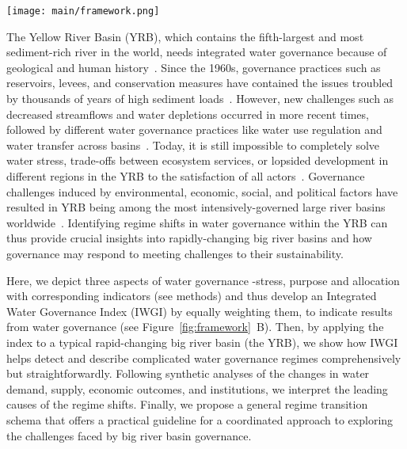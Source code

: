 \begin{figure*}[!ht]
	\centerline{
		\texttt{[image: main/framework.png]}
	}
	\caption{
		\textbf{A.} Identifying the water governance regimes in transitions of a hydrosocial cycle with an integrated water governance index (IWGI). Water stress (S), purposes of water services (P), and water allocation (A) are three aspects to be considered.
		For example, reservoir construction ( and ) can relieve local water stress; The development of intensive irrigated agriculture () and growth of energy industrial demand () will change the purpose of water use; The water delivery system controls water allocation ( and ) within the basin system.
		\textbf{B.} Therefore, the methodology is to combine three aspects' corresponding indicators, and then an abrupt change of the IWGI can indicate a regime shift in water governance.
	}\label{fig:framework}
\end{figure*}


The Yellow River Basin (YRB), which contains the fifth-largest and most sediment-rich river in the world, needs integrated water governance because of geological and human history~\cite{mostern2021,best2019}.
Since the 1960s, governance practices such as reservoirs, levees, and conservation measures have contained the issues troubled by thousands of years of high sediment loads~\cite{wang2016a,song2020}.
However, new challenges such as decreased streamflows and water depletions occurred in more recent times, followed by different water governance practices like water use regulation and water transfer across basins~\cite{wang2019c}.
Today, it is still impossible to completely solve water stress, trade-offs between ecosystem services, or lopsided development in different regions in the YRB to the satisfaction of all actors~\cite{wohlfart2016}.
Governance challenges induced by environmental, economic, social, and political factors have resulted in YRB being among the most intensively-governed large river basins worldwide~\cite{nickum2021}.
Identifying regime shifts in water governance within the YRB can thus provide crucial insights into rapidly-changing big river basins and how governance may respond to meeting challenges to their sustainability.

Here, we depict three aspects of water governance -stress, purpose and allocation with corresponding indicators (see methods) and thus develop an Integrated Water Governance Index (IWGI) by equally weighting them, to indicate results from water governance (see Figure~\ref{fig:framework}~B).
Then, by applying the index to a typical rapid-changing big river basin (the YRB), we show how IWGI helps detect and describe complicated water governance regimes comprehensively but straightforwardly.
Following synthetic analyses of the changes in water demand, supply, economic outcomes, and institutions, we interpret the leading causes of the regime shifts.
Finally, we propose a general regime transition schema that offers a practical guideline for a coordinated approach to exploring the challenges faced by big river basin governance.
